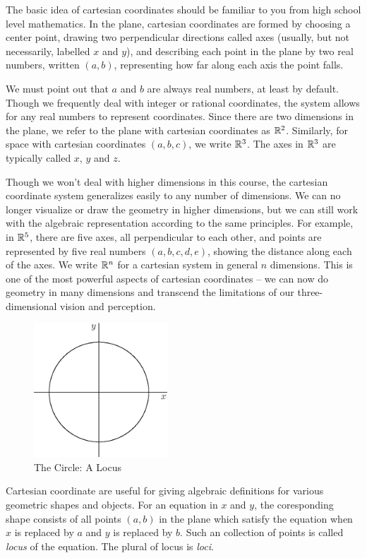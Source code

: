 \documentclass[fleqn]{report}
\begin{document}
The basic idea of cartesian coordinates should be familiar to
you from high school level mathematics. In the plane, 
cartesian coordinates are formed by choosing
a center point, drawing two perpendicular directions called axes
(usually, but not necessarily, labelled $x$ and $y$), and
describing each point in the plane by two real numbers, written
$(a,b)$, representing how far along each axis the point falls.

We must point out that $a$ and $b$ are always real numbers, at
least by default. Though we frequently deal with integer or
rational coordinates, the system allows for any real numbers to
represent coordinates. Since there are two dimensions in the
plane, we refer to the plane with cartesian coordinates as
$\mathbb{R}^2$. Similarly, for space with cartesian coordinates
$(a,b,c)$, we write $\mathbb{R}^3$. The axes in $\mathbb{R}^3$ are typically called
$x$, $y$ and $z$. 

Though we won't deal with higher dimensions in this course, the
cartesian coordinate system generalizes easily to any number
of dimensions. We can no longer visualize or draw the
geometry in higher dimensions, but we can still work with the
algebraic representation according to the same principles.
For example, in $\mathbb{R}^5$, there are five axes, all
perpendicular to each other, and points are represented by
five real numbers $(a,b,c,d,e)$, showing the distance along
each of the axes. We write $\mathbb{R}^n$ for a cartesian system in
general $n$ dimensions. This is one of the most powerful
aspects of cartesian coordinates -- we can now do geometry in
many dimensions and transcend the limitations of our
three-dimensional vision and perception.

\begin{figure}[t]
\centering
\includegraphics[width=5cm]{figure64.eps}
\caption{The Circle: A Locus}
\label{The Circle}
\end{figure}

Cartesian coordinate are useful for giving
algebraic definitions for various geometric shapes and objects.
For an equation in $x$ and $y$, the coresponding shape consists
of all points $(a,b)$ in the plane which satisfy the equation
when $x$ is replaced by $a$ and $y$ is replaced by $b$. 
Such an collection of points is called \emph{locus} of the
equation. The plural of locus is \emph{loci}.
\end{document}
